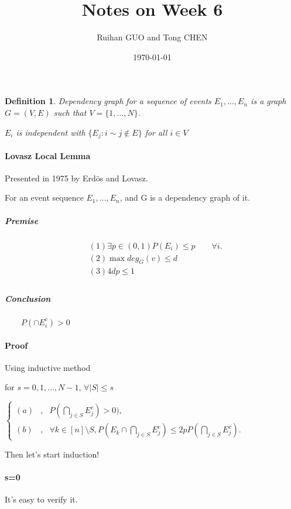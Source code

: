 \documentclass{article}
\title{Notes on Week 6}
\author{Ruihan GUO and Tong CHEN}
\date{\today}
\newtheorem{definition}[theorem]{Definition}
\begin{document}
    \maketitle
\section{}

\begin{definition}
Dependency graph for a sequence of events $E_1,\dots,E_n$ is a graph $G = (V,E)$ such that $V = \{1,\dots,N\}$.\par
$E_i$ is independent with $\{E_j:i\sim j\notin E\}$ for all $i\in V$\par
\end{definition}
\paragraph{Lovasz Local Lemma}
Presented in 1975 by Erd{\"o}s and Lovasz.\par
For an event sequence $E_1,\dots,E_n$, and G is a dependency graph of it.\par
\subparagraph{Premise}
\begin{align*}
&(1)\exists p \in (0,1) P(E_i) \leq p \qquad\forall i.\\
&(2)\max deg_G(v) \leq d\\
&(3)4dp \leq 1\\
\end{align*}
\subparagraph{Conclusion}$\qquad P\left(\cap E_{i}^{c}\right) > 0$\par
\paragraph{Proof}Using inductive method\par
for $s = 0,1,\dots,N-1$, $\forall \left|S\right| \leq s$\par
$\left\{
\begin{aligned}
(a)& , & P\left(\bigcap_{j \in S}E_{j}^{c}\right)>0), \\
(b)& , & \forall k \in [n]\setminus S, P(E_k\cap\bigcap_{j \in S} E_{j}^{c}) \leq 2pP\left(\bigcap_{j \in S}E_{j}^{c}\right).
\end{aligned}\right.$\\\par
Then let's start induction!\par
\paragraph{s=0} It's easy to verify it.\par
\end{document}
